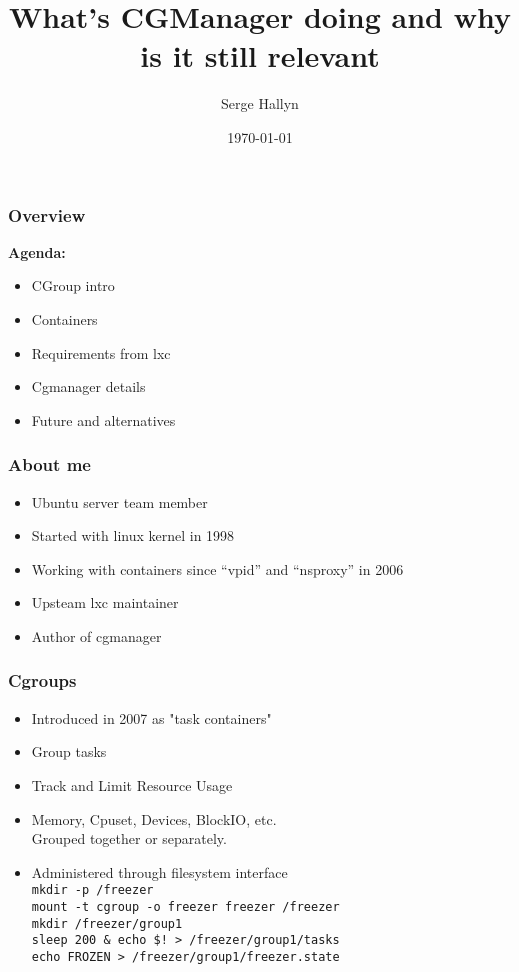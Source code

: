 \documentclass{beamer}
\title[User Namespaces]{What's CGManager doing and why is it still relevant} %
\author{Serge Hallyn} %
\institute[Canonical] %
{
Canonical, Inc \\ %
\medskip
\textit{serge.hallyn@ubuntu.com} %
}
\date{\today} %
\begin{document}
\begin{frame}
\titlepage %
\end{frame}

\begin{frame}
\frametitle{Overview}

\textbf{Agenda:}
\begin{itemize}
\item CGroup intro
\item Containers
\item Requirements from lxc
\item Cgmanager details
\item Future and alternatives
\end{itemize}
\end{frame}

\begin{frame}
\frametitle{About me}
\begin{itemize}
\item Ubuntu server team member
\item Started with linux kernel in 1998
\item Working with containers since ``vpid'' and ``nsproxy'' in 2006
\item Upsteam lxc maintainer
\item Author of cgmanager
\end{itemize}
\end{frame}


\begin{frame}
\frametitle{Cgroups}
\begin{itemize}
\item Introduced in 2007 as "task containers"
\item Group tasks
\item Track and Limit Resource Usage
\item Memory, Cpuset, Devices, BlockIO, etc. \\
Grouped together or separately.
\item Administered through filesystem interface \\ 
\vspace{0.2in}
{\tt \small mkdir -p /freezer \\
mount -t cgroup -o freezer freezer /freezer \\
mkdir /freezer/group1 \\
sleep 200 \& echo \$! > /freezer/group1/tasks \\
echo FROZEN > /freezer/group1/freezer.state}
\end{itemize}
\end{frame}
\end{document}
